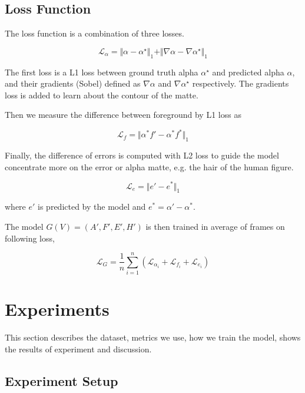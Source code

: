 \documentclass[final]{cvpr}
\begin{document}
\subsection{Loss Function}

The loss function is a combination of three losses.

\begin{equation}\label{lossAlpha}
    \mathcal{L}_\alpha=\Vert\alpha-\alpha^\star\Vert_1+\Vert\nabla\alpha-\nabla\alpha^\star\Vert_1
\end{equation}

The first loss is a L1 loss between ground truth alpha $\alpha^\star$ and predicted alpha $\alpha$, and their gradients (Sobel) defined as $\nabla \alpha$ and $\nabla \alpha^\star$ respectively.
The gradients loss is added to learn about the contour of the matte.

Then we measure the difference between foreground by L1 loss as

\begin{equation}\label{lossForeground}
    \mathcal{L}_f=\Vert\alpha^*f'-\alpha^*f^*\Vert_1
\end{equation}

Finally, the difference of errors is computed with L2 loss to guide the model concentrate more on the error or alpha matte, e.g. the hair of the human figure.

\begin{equation}\label{lossError}
    \mathcal{L}_e=\Vert e'-e^*\Vert_1
\end{equation}

where $e'$ is predicted by the model and $e^*=\alpha'-\alpha^*$.

The model $G(V)=(A',F',E',H')$ is then trained in average of frames on following loss,

\begin{equation}\label{lossG}
    \mathcal{L}_G=\frac{1}{n}\sum_{i=1}^n\left(\mathcal{L}_{\alpha_i}+\mathcal{L}_{f_i}+\mathcal{L}_{e_i}\right)
\end{equation}

\section{Experiments}

This section describes the dataset, metrics we use, how we train the model, shows the results of experiment and discussion.

\subsection{Experiment Setup}
\end{document}
